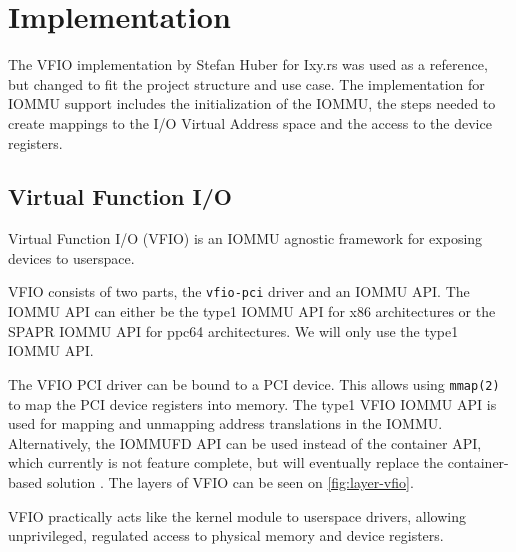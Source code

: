 \chapter{Implementation} \label{c:impl}

The VFIO implementation by Stefan Huber for Ixy.rs was used as a reference, but changed to fit the project structure and use case. The implementation for IOMMU support includes the initialization of the IOMMU, the steps needed to create mappings to the I/O Virtual Address space and the access to the device registers.

\section{Virtual Function I/O}
Virtual Function I/O (VFIO) is an IOMMU agnostic framework for exposing devices to userspace.

VFIO consists of two parts, the \texttt{vfio-pci} driver and an IOMMU API. The IOMMU API can either be the type1 IOMMU API for x86 architectures or the SPAPR IOMMU API for ppc64 architectures. We will only use the type1 IOMMU API.

The VFIO PCI driver can be bound to a PCI device. This allows using \texttt{mmap(2)} to map the PCI device registers into memory. The type1 VFIO IOMMU API is used for mapping and unmapping address translations in the IOMMU. Alternatively, the IOMMUFD API can be used instead of the container API, which currently is not feature complete, but will eventually replace the container-based solution \cite{vfiokerneldocs}. The layers of VFIO can be seen on \autoref{fig:layer-vfio}.

VFIO practically acts like the kernel module to userspace drivers, allowing unprivileged, regulated access to physical memory and device registers.

